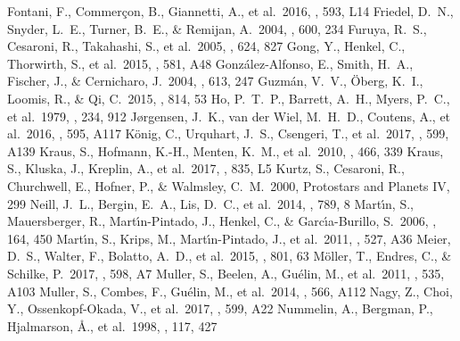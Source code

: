 \documentclass{aa}
\begin{document}
\begin{thebibliography}{}
 Fontani, F., Commer{\c c}on, B., Giannetti, A., et al.\ 2016, \aap, 593, L14 
 Friedel, D.~N., Snyder, L.~E., Turner, B.~E., \& Remijan, A.\ 2004, \apj, 600, 234 
 Furuya, R.~S., Cesaroni, R., Takahashi, S., et al.\ 2005, \apj, 624, 827 
 Gong, Y., Henkel, C., Thorwirth, S., et al.\ 2015, \aap, 581, A48 
 Gonz{\'a}lez-Alfonso, E., Smith, H.~A., Fischer, J., \& Cernicharo, J.\ 2004, \apj, 613, 247 
 Guzm{\'a}n, V.~V., {\"O}berg, K.~I., Loomis, R., \& Qi, C.\ 2015, \apj, 814, 53 
 Ho, P.~T.~P., Barrett, A.~H., Myers, P.~C., et al.\ 1979, \apj, 234, 912 
 J{\o}rgensen, J.~K., van der Wiel, M.~H.~D., Coutens, A., et al.\ 2016, \aap, 595, A117 
 K{\"o}nig, C., Urquhart, J.~S., Csengeri, T., et al.\ 2017, \aap, 599, A139 
 Kraus, S., Hofmann, K.-H., Menten, K.~M., et al.\ 2010, \nat, 466, 339 
 Kraus, S., Kluska, J., Kreplin, A., et al.\ 2017, \apjl, 835, L5 
 Kurtz, S., Cesaroni, R., Churchwell, E., Hofner, P., \& Walmsley, C.~M.\ 2000, Protostars and Planets IV, 299 
 Neill, J.~L., Bergin, E.~A., Lis, D.~C., et al.\ 2014, \apj, 789, 8 
 Mart{\'{\i}}n, S., Mauersberger, R., Mart{\'{\i}}n-Pintado, J., Henkel, C., \& Garc{\'{\i}}a-Burillo, S.\ 2006, \apjs, 164, 450 
 Mart{\'{\i}}n, S., Krips, M., Mart{\'{\i}}n-Pintado, J., et al.\ 2011, \aap, 527, A36 
 Meier, D.~S., Walter, F., Bolatto, A.~D., et al.\ 2015, \apj, 801, 63 
 M{\"o}ller, T., Endres, C., \& Schilke, P.\ 2017, \aap, 598, A7 
 Muller, S., Beelen, A., Gu{\'e}lin, M., et al.\ 2011, \aap, 535, A103 
 Muller, S., Combes, F., Gu{\'e}lin, M., et al.\ 2014, \aap, 566, A112 
 Nagy, Z., Choi, Y., Ossenkopf-Okada, V., et al.\ 2017, \aap, 599, A22 
 Nummelin, A., Bergman, P., Hjalmarson, {\AA}., et al.\ 1998, \apjs, 117, 427 

\end{thebibliography}
\end{document}
